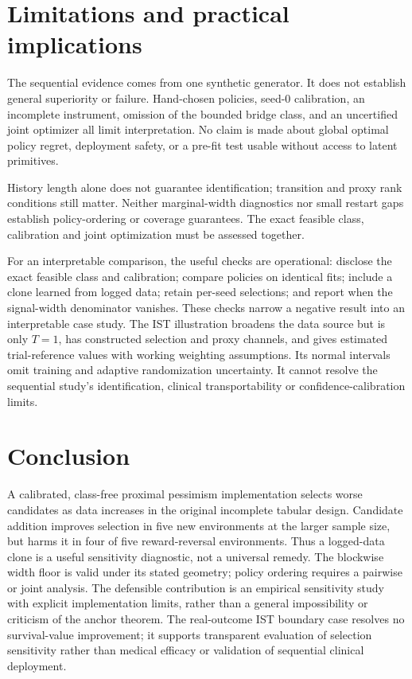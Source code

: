 \documentclass[11pt]{article}
\begin{document}
\section{Limitations and practical implications}
The sequential evidence comes from one synthetic generator. It does not
establish general superiority or failure. Hand-chosen policies, seed-0 calibration,
an incomplete instrument, omission of the bounded bridge class, and an
uncertified joint optimizer all limit interpretation. No claim is made about
global optimal policy regret, deployment safety, or a pre-fit test usable
without access to latent primitives.

History length alone does not guarantee identification; transition and proxy
rank conditions still matter. Neither marginal-width diagnostics nor small
restart gaps establish policy-ordering or coverage guarantees. The exact
feasible class, calibration and joint optimization must be assessed together.

For an interpretable comparison, the useful checks are operational: disclose the exact
feasible class and calibration; compare policies on identical fits; include a
clone learned from logged data; retain per-seed selections; and report when
the signal-width denominator vanishes. These checks narrow a negative result
into an interpretable case study.
The IST illustration broadens the data source but is only $T=1$, has constructed
selection and proxy channels, and gives estimated trial-reference values with
working weighting assumptions. Its normal intervals omit training and adaptive
randomization uncertainty. It cannot resolve the sequential study's
identification, clinical transportability or confidence-calibration limits.

\section{Conclusion}
A calibrated, class-free proximal pessimism implementation selects worse
candidates as data increases in the original incomplete tabular design.
Candidate addition improves selection in five new environments at the larger
sample size, but harms it in four of five reward-reversal environments.
Thus a logged-data clone is a useful sensitivity diagnostic, not a universal
remedy. The blockwise width floor is valid under its stated geometry;
policy ordering requires a pairwise or joint analysis. The defensible
contribution is an empirical sensitivity study with explicit implementation
limits, rather than a general impossibility or criticism of the anchor theorem.
The real-outcome IST boundary case resolves no survival-value improvement;
it supports transparent evaluation of selection sensitivity rather than
medical efficacy or validation of sequential clinical deployment.
\end{document}
